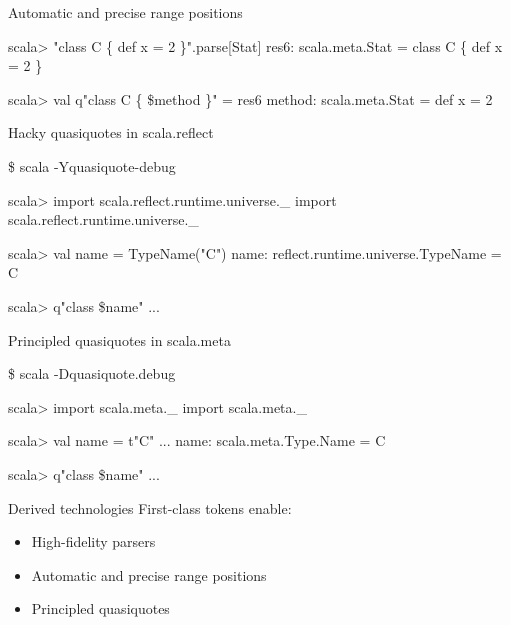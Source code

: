 \documentclass[svgnames,dvipsnames,hyperref={bookmarks=false},usepdftitle=false]{beamer}
\begin{document}
\begin{frame}[fragile]{Automatic and precise range positions}
\begin{semiverbatim}
scala> "class C \{ def x = 2 \}".parse[Stat]
res6: scala.meta.Stat = class C \{ def x = 2 \}

scala> val q"class C \{ \$method \}" = res6
method: scala.meta.Stat = def x = 2

\end{semiverbatim}
\end{frame}

\begin{frame}[fragile]{Hacky quasiquotes in scala.reflect}
\begin{semiverbatim}
\$ scala -Yquasiquote-debug

scala> import scala.reflect.runtime.universe.\_
import scala.reflect.runtime.universe.\_

scala> val name = TypeName("C")
name: reflect.runtime.universe.TypeName = C

scala> q"class \alert<2->{\$name}"
...
\end{semiverbatim}
\end{frame}

\begin{frame}[fragile]{Principled quasiquotes in scala.meta}
\begin{semiverbatim}
\$ scala -Dquasiquote.debug

scala> import scala.meta.\_
import scala.meta.\_

scala> val name = t"C"
...
name: scala.meta.Type.Name = C

scala> q"class \alert<2->{\$name}"
...
\end{semiverbatim}
\end{frame}

\begin{frame}{Derived technologies}
First-class tokens enable:
\begin{itemize}
\item High-fidelity parsers
\item Automatic and precise range positions
\item Principled quasiquotes
\end{itemize}
\end{frame}
\end{document}
